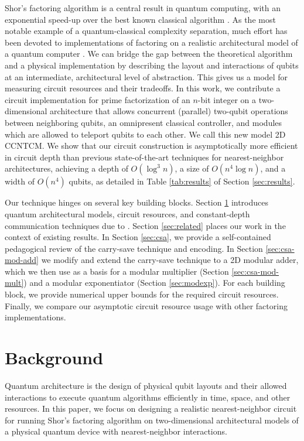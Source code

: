\documentclass[twoside]{article}
\begin{document}
Shor's factoring algorithm is a central result in quantum computing, with an
exponential speed-up over the best known classical algorithm \cite{Shor1994}.
As the most notable example of a quantum-classical complexity separation, much
effort has been devoted to implementations of factoring on a
realistic architectural model of a quantum computer
\cite{Beauregard2002,Kutin2006,VanMeter2006,VanMeter2005,VanMeterIL2005}.
We can bridge the gap between
the theoretical algorithm and a physical implementation by describing
the layout and interactions of qubits at an intermediate,
architectural level of abstraction.
This gives us a model for measuring circuit resources and their tradeoffs.
In this work, we contribute a circuit implementation for prime
factorization of an $n$-bit integer
on a two-dimensional architecture that allows concurrent (parallel) two-qubit operations
between neighboring qubits, an omnipresent classical controller, and
modules which are allowed to teleport qubits to each other. We call this new
model \textsc{2D CCNTCM}.
We show that our circuit construction is asymptotically more efficient in circuit depth than previous state-of-the-art techniques for nearest-neighbor
architectures, achieving a depth of $O(\log^3 n)$, a size of
$O(n^4\log n)$, and a width of $O(n^4)$ qubits, as detailed in Table
\ref{tab:results} of Section \ref{sec:results}.

Our technique hinges on several key building blocks.
Section \ref{sec:bg} introduces quantum architectural models, circuit
resources, and constant-depth communication techniques due to
\cite{Harrow2012,Rosenbaum2012}.
Section \ref{sec:related} places our work in the context of existing
results.
In Section \ref{sec:csa}, we provide a self-contained pedagogical review
of the carry-save technique and encoding.
In Section \ref{sec:csa-mod-add} we modify and extend the carry-save technique to a 2D
modular adder,
which we then use as a basis for a modular multiplier
(Section \ref{sec:csa-mod-mult}) and a modular exponentiator
(Section \ref{sec:modexp}).
For each building block, we provide numerical upper bounds for the
required circuit resources.
Finally, we compare our asymptotic circuit resource usage
with other factoring implementations.

%
\section{Background}
\label{sec:bg}

Quantum architecture is the design of physical qubit layouts
and their allowed interactions to execute
quantum algorithms efficiently in time, space, and other
resources.
In this paper, we focus on designing a realistic nearest-neighbor circuit for running
Shor's factoring algorithm on two-dimensional
architectural models of a physical quantum device with nearest-neighbor
interactions.
\end{document}

